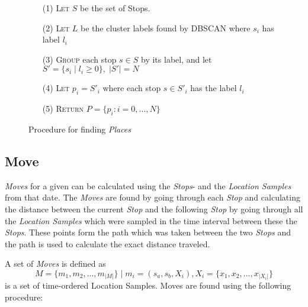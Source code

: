 \begin{figure}[h]
    \centering
    \begin{center}
    \begin{itemize}
    \item[(1)] \textsc{Let} $S$ be the set of Stops.
    \item[(2)] \textsc{Let} $L$ be the cluster labels found by  DBSCAN where $s_i$ has label $l_i$ 
    \item[(3)] \textsc{Group} each stop $s \in S$ by its label, and let $S' = \{s_i \;|\; l_i \geq 0\}, \;|S'| = N$
    \item[(4)] \textsc{Let} $p_i = S'_i$ where each stop $s \in S'_i$ has the label $l_i$
    \item[(5)] \textsc{Return} $P = \{p_i : i = 0, ..., N\}$
\end{itemize} 
\end{center}
    \caption{Procedure for finding \textit{Places}}
    \label{fig:find_places}
\end{figure}

\subsection{Move}
\textit{Moves} for a given can be calculated using the \textit{Stops}- and the \textit{Location Samples} from that date. The \textit{Moves} are found by going through each \textit{Stop} and calculating the distance between the current \textit{Stop} and the following \textit{Stop} by going through all the \textit{Location Samples} which were sampled in the time interval between these the \textit{Stops}. These points form the path which was taken between the two \textit{Stops} and the path is used to calculate the exact distance traveled.

A set of \textit{Moves} is defined as 
$$M = \{m_1, m_2, ..., m_{|M|}\} \;| \; m_i = (s_a, s_b, X_i), X_i = \{x_1, x_2, ..., x_{|X_i|}\}$$ 
is a set of time-ordered Location Samples. Moves are found using the following procedure:


